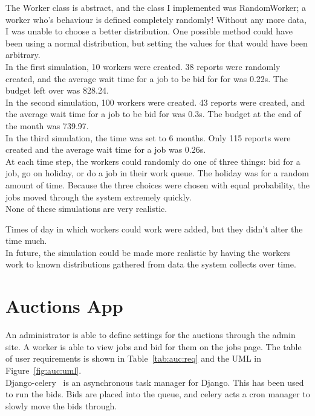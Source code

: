 The Worker class is abstract, and the class I implemented was RandomWorker; a worker who's behaviour is defined completely randomly! Without any more data, I was unable to choose a better distribution. One possible method could have been using a normal distribution, but setting the values for that would have been arbitrary. \\

In the first simulation, 10 workers were created. 38 reports were randomly created, and the average wait time for a job to be bid for for was 0.22s. The budget left over was 828.24. \\

In the second simulation, 100 workers were created. 43 reports were created, and the average wait time for a job to be bid for was 0.3s. The budget at the end of the month was 739.97. \\

In the third simulation, the time was set to 6 months. Only 115 reports were created and the average wait time for a job was 0.26s. \\

At each time step, the workers could randomly do one of three things: bid for a job, go on holiday, or do a job in their work queue. The holiday was for a random amount of time. Because the three choices were chosen with equal probability, the jobs moved through the system extremely quickly. \\

None of these simulations are very realistic.

Times of day in which workers could work were added, but they didn't alter the time much. \\

In future, the simulation could be made more realistic by having the workers work to known distributions gathered from data the system collects over time.


\section{Auctions App}
An administrator is able to define settings for the auctions through the admin site. A worker is able to view jobs and bid for them on the jobs page. The table of user requirements is shown in Table~\ref{tab:auc:req} and the UML in Figure~\ref{fig:auc:uml}. \\

Django-celery~\cite{celery} is an asynchronous task manager for Django. This has been used to run the bids. Bids are placed into the queue, and celery acts a cron manager to slowly move the bids through.

